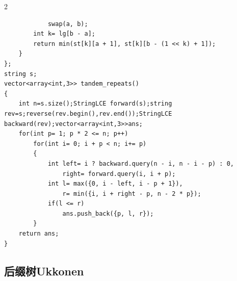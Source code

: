 \documentclass[UTF8,fontset=fandol,a4paper,twoside]{ctexart}
\begin{document}
\begin{multicols}{2}
\begin{lstlisting}
            swap(a, b);
        int k= lg[b - a];
        return min(st[k][a + 1], st[k][b - (1 << k) + 1]);
    }
};
string s;
vector<array<int,3>> tandem_repeats()
{
    int n=s.size();StringLCE forward(s);string rev=s;reverse(rev.begin(),rev.end());StringLCE backward(rev);vector<array<int,3>>ans;
    for(int p= 1; p * 2 <= n; p++)
        for(int i= 0; i + p < n; i+= p)
        {
            int left= i ? backward.query(n - i, n - i - p) : 0,
                right= forward.query(i, i + p);
            int l= max({0, i - left, i - p + 1}),
                r= min({i, i + right - p, n - 2 * p});
            if(l <= r)
                ans.push_back({p, l, r});
        }
    return ans;
}
\end{lstlisting}
\subsection{后缀树Ukkonen}


\end{multicols}
\end{document}
